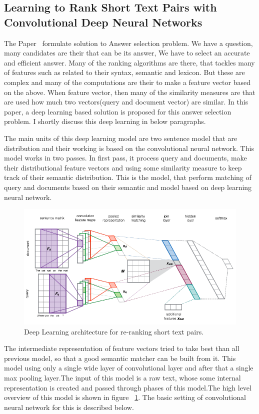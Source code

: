 \documentclass{doublecol-new}
\theoremstyle{TH}{
\newtheorem{lemma}{Lemma}
\newtheorem{theorem}[lemma]{Theorem}
\newtheorem{corrolary}[lemma]{Corrolary}
\newtheorem{conjecture}[lemma]{Conjecture}
\newtheorem{proposition}[lemma]{Proposition}
\newtheorem{claim}[lemma]{Claim}
\newtheorem{stheorem}[lemma]{Wrong Theorem}
\newtheorem{algorithm}{Algorithm}
}
\theoremstyle{THrm}{
\newtheorem{definition}{Definition}[section]
\newtheorem{question}{Question}[section]
\newtheorem{remark}{Remark}
\newtheorem{scheme}{Scheme}
}
\theoremstyle{THhit}{
\newtheorem{case}{Case}[section]
}
\begin{document}
\subsection{Learning to Rank Short Text Pairs with Convolutional Deep Neural Networks}
The Paper~\cite{severyn2015learning} formulate solution to Answer selection problem. We have a question, many candidates are  their that can be its answer, We have to select an accurate and efficient answer. Many of the ranking algorithms are there, that tackles many of features such as related to their syntax, semantic and lexicon. But these are complex and many of the computations are their to make a feature vector based on the above. When feature vector, then many of the similarity measures are that are used how much two vectors(query and document vector) are similar. In this paper, a deep learning based solution is proposed for this answer selection problem. I shortly discuss this deep learning in below paragraphs. 

The main units of this deep learning model are two sentence model that are distribution and their working is based on the convolutional neural network. This model works in two passes. In first pass, it process query and documents, make their distributional feature vectors and using some similarity measure to keep track of their semantic distribution. This is the model, that perform matching of query and documents based on their semantic and model based on deep learning neural network. 
\begin{figure}[t]
	\centerline{\includegraphics[width=\textwidth]{image/rerankshorttextpairs.PNG}}
	\caption{Deep Learning architecture for re-ranking short text pairs.}
	\label{fig:rerankshorttextpairs}
\end{figure} 

The intermediate representation of feature vectors tried to take best than all previous model, so that a good semantic matcher can be built from it. This model using only a single wide layer of convolutional layer and after that a single max pooling layer.The input of this model is a raw text, whose some internal representation is created and passed through phases of this model.The high level overview of this model is shown in figure ~\ref{fig:rerankshorttextpairs}. The basic setting of convolutional neural network for this is described below.
\end{document}
